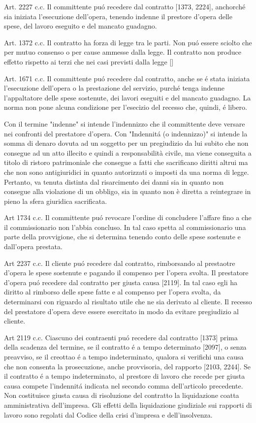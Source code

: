 \documentclass{article}
\begin{document}
Art. 2227 c.c. Il committente pu\'o recedere dal contratto [1373, 2224], anchorch\'e sia iniziata l'esecuzione dell'opera, tenendo indenne il prestore d'opera delle spese, del lavoro eseguito e del mancato guadagno.

Art. 1372 c.c. Il contratto ha forza di legge tra le parti. Non pu\'o essere sciolto che per mutuo consenso o per cause ammesse dalla legge. Il contratto non produce effetto rispetto ai terzi che nei casi previsti dalla legge []

Art. 1671 c.c. Il committente pu\'o recedere dal contratto, anche se \'e stata iniziata l'esecuzione dell'opera o la prestazione del servizio, purch\'e tenga indenne l'appaltatore delle spese sostenute, dei lavori eseguiti e del mancato guadagno. La norma non pone alcuna condizione per l'esecizio del recesso che, quindi, \'e libero.

Con il termine "indenne" si intende l'indennizzo che il committente deve versare nei confronti del prestatore d'opera. Con "Indennit\'a (o indennizzo)" si intende la somma di denaro dovuta ad un soggetto per un pregiudizio da lui subito che non consegue ad un atto illecito e quindi a responsabilità civile, ma viene conseguita a titolo di ristoro patrimoniale che consegue a fatti che sacrificano diritti altrui ma che non sono antigiuridici in quanto autorizzati o imposti da una norma di legge. Pertanto, va tenuta distinta dal risarcimento dei danni sia in quanto non consegue alla violazione di un obbligo, sia in quanto non è diretta a reintegrare in pieno la sfera giuridica sacrificata.

Art 1734 c.c. Il committente pu\'o revocare l'ordine di concludere l'affare fino a che il commissionario non l'abbia concluso. In tal caso spetta al commissionario una parte della provvigione, che si determina tenendo conto delle spese sostenute e dall'opera prestata.

Art 2237 c.c. Il cliente pu\'o recedere dal contratto, rimborsando al prestaotre d'opera le spese sostenute e pagando il compenso per l'opera svolta. Il prestatore d'opera pu\'o recedere dal contratto per giusta causa [2119]. In tal caso egli ha diritto al rimborso delle spese fatte e al compenso per l'opera svolta, da determinarsi con riguardo al risultato utile che ne sia derivato al cliente. Il recesso del prestatore d'opera deve essere esercitato in modo da evitare pregiudizio al cliente.

Art 2119 c.c. Ciascuno dei contraenti pu\'o recedere dal contratto [1373] prima della scadenza del termine, se il contratto \'e a tempo determinato [2097], o senza preavviso, se il creottao \'e a tempo indeterminato, qualora si verifichi una causa che non consenta la prosecuzione, anche provvisoria, del rapporto [2103, 2244]. Se il contratto \'e a tempo indeterminato, al prestore di lavoro che recede per giusta causa compete l'indennit\'a indicata nel secondo comma dell'articolo precedente. Non costituisce giusta causa di risoluzione del contratto la liquidazione coatta amministrativa dell'impresa. Gli effetti della liquidazione giudiziale sui rapporti di lavoro sono regolati dal Codice della crisi d'impresa e dell'insolvenza. 
\end{document}
